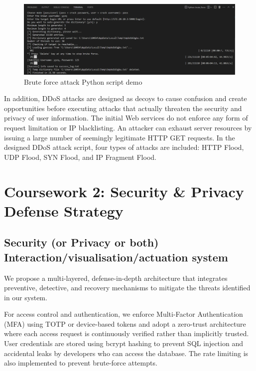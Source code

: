 \documentclass{article}
\begin{document}
\begin{figure}[htb]
    \centering
    \includegraphics[width=1\textwidth]{images/Brute_force_attack_Python_script_demo.png}
    \caption{Brute force attack Python script demo}
    \label{fig:brute_force_attack}
\end{figure}

In addition, DDoS attacks are designed as decoys to cause confusion and create opportunities before executing attacks that actually threaten the security and privacy of user information. The initial Web services do not enforce any form of request limitation or IP blacklisting. An attacker can exhaust server resources by issuing a large number of seemingly legitimate HTTP GET requests. In the designed DDoS attack script, four types of attacks are included: HTTP Flood, UDP Flood, SYN Flood, and IP Fragment Flood.








\section{Coursework 2: Security \& Privacy Defense Strategy}
\subsection{Security (or Privacy or both) Interaction/visualisation/actuation system}
We propose a multi-layered, defense-in-depth architecture that integrates preventive, detective, and recovery mechanisms to mitigate the threats identified in our system.

For access control and authentication, we enforce Multi-Factor Authentication (MFA) using TOTP or device-based tokens and adopt a zero-trust architecture where each access request is continuously verified rather than implicitly trusted. User credentials are stored using bcrypt hashing to prevent SQL injection and accidental leaks by developers who can access the database. The rate limiting is also implemented to prevent brute-force attempts.
\end{document}
